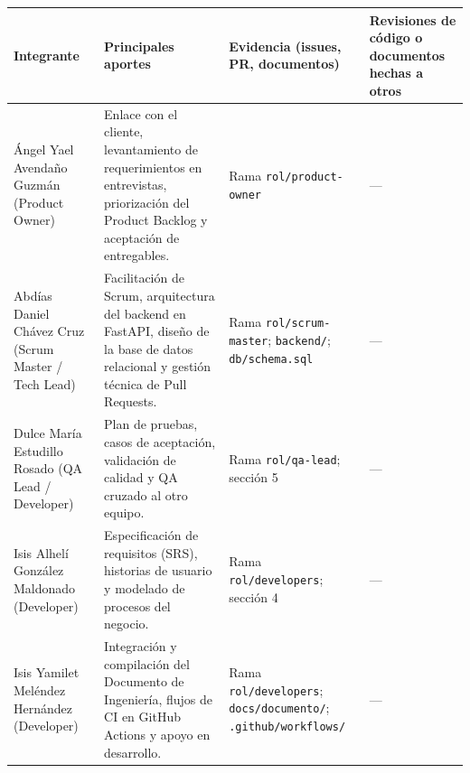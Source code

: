 {\def\LTcaptype{none} %
\begin{longtable}[]{@{}
  >{\raggedright\arraybackslash}p{}
  >{\raggedright\arraybackslash}p{}
  >{\raggedright\arraybackslash}p{}
  >{\raggedright\arraybackslash}p{}@{}}
\toprule\noalign{}
\begin{minipage}[b]{\linewidth}\raggedright
\textbf{Integrante}
\end{minipage} & \begin{minipage}[b]{\linewidth}\raggedright
\textbf{Principales aportes}
\end{minipage} & \begin{minipage}[b]{\linewidth}\raggedright
\textbf{Evidencia (issues, PR, documentos)}
\end{minipage} & \begin{minipage}[b]{\linewidth}\raggedright
\textbf{Revisiones de código o documentos hechas a otros}
\end{minipage} \\
\midrule\noalign{}
\endhead
\bottomrule\noalign{}
\endlastfoot
Ángel Yael Avendaño Guzmán (Product Owner) & Enlace con el cliente,
levantamiento de requerimientos en entrevistas, priorización del Product
Backlog y aceptación de entregables. & Rama \texttt{rol/product-owner} &
--- \\
Abdías Daniel Chávez Cruz (Scrum Master / Tech Lead) & Facilitación de
Scrum, arquitectura del backend en FastAPI, diseño de la base de datos
relacional y gestión técnica de Pull Requests. & Rama
\texttt{rol/scrum-master}; \texttt{backend/}; \texttt{db/schema.sql} &
--- \\
Dulce María Estudillo Rosado (QA Lead / Developer) & Plan de pruebas,
casos de aceptación, validación de calidad y QA cruzado al otro
equipo. & Rama \texttt{rol/qa-lead}; sección 5 & --- \\
Isis Alhelí González Maldonado (Developer) & Especificación de requisitos
(SRS), historias de usuario y modelado de procesos del negocio. & Rama
\texttt{rol/developers}; sección 4 & --- \\
Isis Yamilet Meléndez Hernández (Developer) & Integración y compilación
del Documento de Ingeniería, flujos de CI en GitHub Actions y apoyo en
desarrollo. & Rama \texttt{rol/developers}; \texttt{docs/documento/};
\texttt{.github/workflows/} & --- \\
\end{longtable}
}
